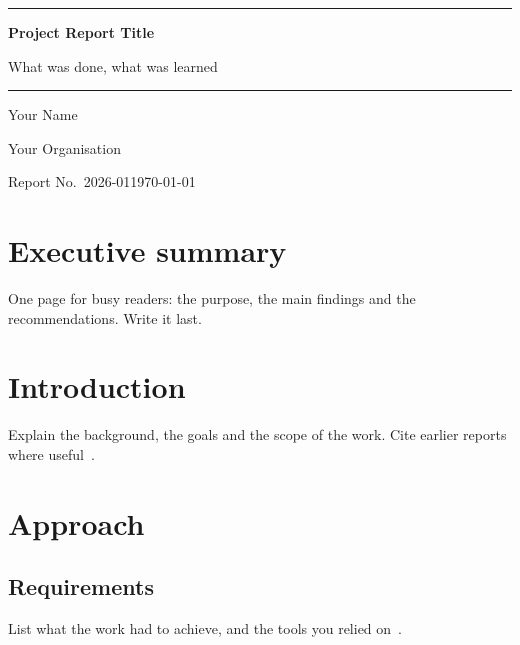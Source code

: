 \documentclass[11pt,a4paper]{report}
\newcommand{\reporttitle}{Project Report Title}
\newcommand{\reportsubtitle}{What was done, what was learned}
\newcommand{\reportauthor}{Your Name}
\newcommand{\reportorg}{Your Organisation}
\newcommand{\reportnumber}{Report No.~2026-01}
\begin{document}
\begin{titlepage}
  \centering
  \vspace*{3cm}
  {\color{MidnightBlue}\rule{\linewidth}{1pt}\par}
  \vspace{1cm}
  {\Huge\bfseries \reporttitle\par}
  \vspace{0.5cm}
  {\Large \reportsubtitle\par}
  \vspace{1cm}
  {\color{MidnightBlue}\rule{\linewidth}{1pt}\par}
  \vfill
  {\large \reportauthor\par}
  \vspace{0.3cm}
  {\reportorg\par}
  \vspace{0.3cm}
  {\reportnumber\quad\textbullet\quad\today\par}
\end{titlepage}

\chapter*{Executive summary}
One page for busy readers: the purpose, the main findings and the
recommendations. Write it last.

\tableofcontents

\cleardoublepage
{}

\chapter{Introduction}
\label{ch:introduction}
Explain the background, the goals and the scope of the work. Cite earlier
reports where useful~\cite{lee2024}.

\chapter{Approach}
\label{ch:approach}
\section{Requirements}
List what the work had to achieve, and the tools you relied on~\cite{tools2025}.
\end{document}
